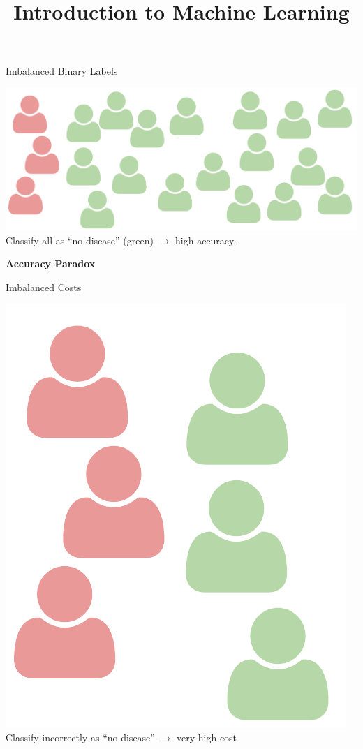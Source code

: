 \documentclass[11pt,compress,t,notes=noshow, xcolor=table]{beamer}
\title{Introduction to Machine Learning}
\institute{\href{https://compstat-lmu.github.io/lecture_i2ml/}{compstat-lmu.github.io/lecture\_i2ml}}
\date{}
\begin{document}











\begin{vbframe}{Imbalanced Binary Labels}

\begin{center}
\includegraphics[width=.9\textwidth]{figure_man/imbalanced.pdf}\\
Classify all as \enquote{no disease} (green) $\rightarrow$ high accuracy.

\lz

\textbf{Accuracy Paradox}
\end{center}

\end{vbframe}


\begin{vbframe}{Imbalanced Costs}

\begin{center}
\includegraphics[width=.3\textwidth]{figure_man/imbalanced-costs.pdf}\\
Classify incorrectly as \enquote{no disease} $\rightarrow$ very high cost

\end{center}

\end{vbframe}
\end{document}
